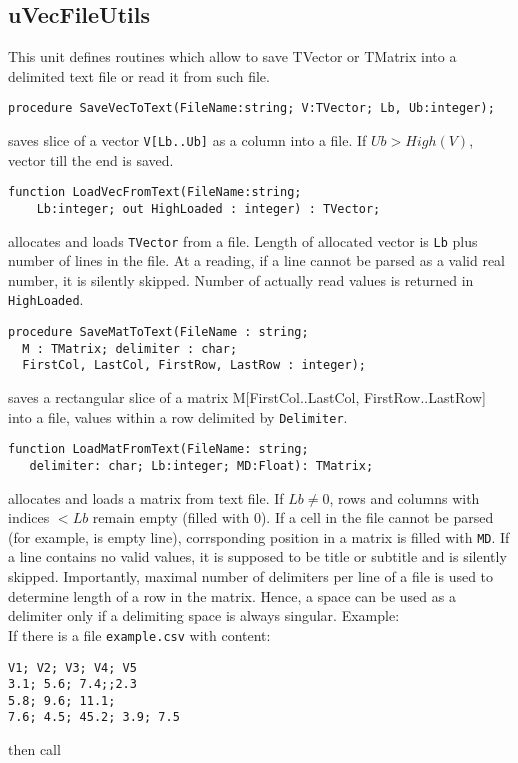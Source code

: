 \documentclass[12pt,a4paper,oneside]{article}
\newcommand{\code}[1]{\texttt{#1}}
\begin{document}
\subsection{uVecFileUtils}
This unit defines routines which allow to save TVector or TMatrix into a delimited text file or read it from such file. 
\begin{verbatim}
procedure SaveVecToText(FileName:string; V:TVector; Lb, Ub:integer);
\end{verbatim} 
saves slice of a vector \code{V[Lb..Ub]} as a column into a file. If $Ub > High(V)$, vector till the end is saved.
\begin{verbatim}
function LoadVecFromText(FileName:string; 
    Lb:integer; out HighLoaded : integer) : TVector;
\end{verbatim} \vskip -6pt
allocates and loads \code{TVector} from a file. Length of allocated vector is \code{Lb} plus number of lines in the file. At a reading, if a line cannot be parsed as a valid real number, it is silently skipped. Number of actually read values is returned in \code{HighLoaded}. 
\begin{verbatim}
procedure SaveMatToText(FileName : string; 
  M : TMatrix; delimiter : char; 
  FirstCol, LastCol, FirstRow, LastRow : integer);
\end{verbatim}  \vskip -6pt
saves a rectangular slice of a matrix M[FirstCol..LastCol, FirstRow..LastRow] into a file, values within a row delimited by \code{Delimiter}.
\begin{verbatim}
function LoadMatFromText(FileName: string; 
   delimiter: char; Lb:integer; MD:Float): TMatrix;
\end{verbatim}  \vskip -6pt
allocates and loads a matrix from text file. If $Lb \ne 0$, rows and columns with indices $<Lb$ remain empty (filled with 0). If a cell in the file cannot be parsed (for example, is empty line), corrsponding position in a matrix is filled with \code{MD}. If a line contains no valid values, it is supposed to be title or subtitle and is silently skipped. Importantly, maximal number of delimiters per line of a file is used to determine length of a row in the matrix. Hence, a space can be used as a delimiter only if a delimiting space is always singular.
Example:\\
If there is a file \code{example.csv} with content:
\begin{verbatim}
V1; V2; V3; V4; V5
3.1; 5.6; 7.4;;2.3
5.8; 9.6; 11.1;
7.6; 4.5; 45.2; 3.9; 7.5
\end{verbatim}
then call\\
\end{document}
